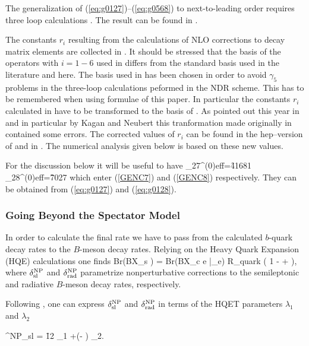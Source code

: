 The generalization of (\ref{eq:g0127})--(\ref{eq:g0568}) to next-to-leading
order requires three loop calculations . The result can be found in
\cite{CZMM}.

The constants $r_i$ resulting from the calculations of NLO corrections
to decay matrix elements \cite{GREUB} are collected in \cite{CZMM}.
It should be stressed that the basis of the operators with $i=1-6$ used
in \cite{CZMM} differs from the standard basis used in the literature
\cite{BBL,GREUB} and here. The basis used in \cite{CZMM} has been chosen in 
order to avoid $\gamma_5$ problems in the three-loop calculations
peformed in the NDR scheme. This has to be remembered when using
formulae of this paper.
In particular the constants $r_i$ calculated in \cite{GREUB} have
to be transformed to the basis of \cite{CZMM}. As pointed out
this year in \cite{GAMB} and in particular by Kagan and Neubert 
\cite{KN98}
this tranformation made originally in \cite{CZMM} contained some errors.
The corrected values of $r_i$ can be found in the hep--version of
\cite{CZMM} and in \cite{KN98}. 
The numerical analysis given below is based on these
new values.

For the discussion below it will be useful to have \cite{CFMRS:93}
\be
\gamma_{27}^{(0){\rm eff}}=\f{416}{81} \qquad
\gamma_{28}^{(0){\rm eff}}=\f{70}{27}
\ee
which enter (\ref{GENC7}) and (\ref{GENC8}) respectively.
They can be obtained from (\ref{eq:g0127}) and (\ref{eq:g0128}).

\subsubsection{Going Beyond the Spectator Model}
In order to calculate the final rate we
have to pass from the calculated $b$-quark decay rates to 
the $B$-meson decay rates. Relying on the
Heavy Quark Expansion (HQE) calculations one finds \cite{CZMM}
%
\be \label{BR} 
Br(B{\to}X_s \gamma) = Br(B{\to}X_c e \bar{\nu_e})
\cdot R_{{\rm quark}} 
\left( 1 - 
         +  \right),
\ee
%
where $\delta^{{\rm NP}}_{{\rm sl}}$ and $\delta^{{\rm NP}}_{{\rm rad}} $
parametrize nonperturbative corrections to the semileptonic and
radiative $B$-meson decay rates, respectively. 

Following \cite{FLS96}, one can express
$\delta^{{\rm NP}}_{{\rm sl}}$ and $\delta^{{\rm NP}}_{{\rm rad}} $
in terms of the HQET parameters $\lambda_1$ and $\lambda_2$

\be
\delta^{{\rm NP}}_{{\rm sl}}  = \f{1}{2} \lambda_1 
+\left(- \right) \lambda_2.
\ee

